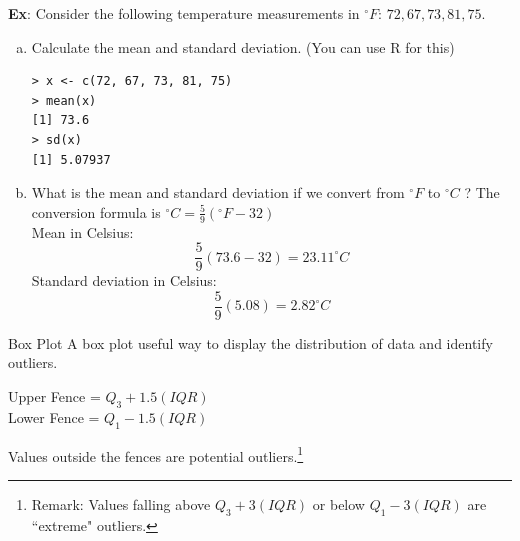 \documentclass{beamer}
\begin{document}
\begin{frame}[fragile]
\small
\textbf{Ex}: Consider the following temperature measurements in $^{\circ}F$: $72, 67, 73, 81, 75$.  
\begin{enumerate}[(a)]
\item Calculate the mean and standard deviation. (You can use R for this)\\
\vspace{-5pt}
{\color{blue}
\begin{verbatim}
> x <- c(72, 67, 73, 81, 75)
> mean(x)
[1] 73.6
> sd(x)
[1] 5.07937
\end{verbatim}
}
\item What is the mean and standard deviation if we convert from $^{\circ}F$ to $^{\circ}C$ ?  The conversion formula is $^{\circ}C = \frac{5}{9} (^{\circ}F - 32)$\\
\medskip
{\color{blue}
Mean in Celsius:\\
$$\frac{5}{9}(73.6 - 32) = 23.11^{\circ}C$$
Standard deviation in Celsius:\\
$$\frac{5}{9} (5.08) = 2.82^{\circ}C$$
}
\end{enumerate}
\end{frame}

\begin{frame}{Box Plot}
A box plot useful way to display the distribution of data and identify outliers.\\
\vspace{10pt}

Upper Fence = $Q_3 + 1.5(IQR)$\\
Lower Fence = $Q_1 - 1.5(IQR)$\\
\vspace{10pt}

Values outside the fences are potential outliers.\footnote{Remark:  Values falling above $Q_3 + 3(IQR)$ or below $Q_1 - 3(IQR)$ are ``extreme" outliers.}
\end{frame}
\end{document}
